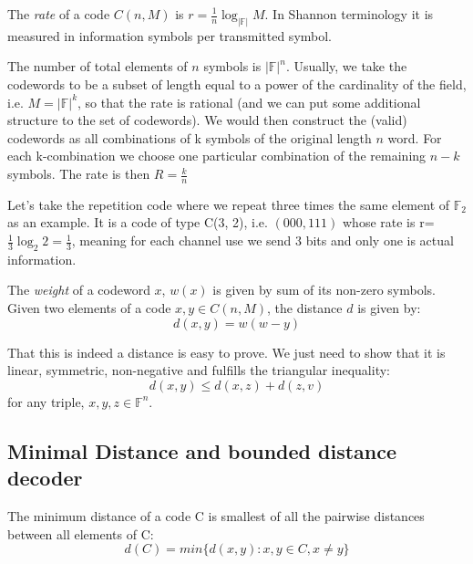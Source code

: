 \begin{definition}
	The \emph{rate} of a code $C(n,M)$ is $r=\frac{1}{n}\log_{|\mathbb{F}|}M$. In Shannon terminology it is measured in information symbols per transmitted symbol.
\end{definition}
The number of total elements of $n$ symbols is $|\mathbb{F}|^{n}$. Usually, we take the codewords to be a subset of length equal to a power of the cardinality of the field, i.e. $M = |\mathbb{F}|^{k}$, so that the rate is rational (and we can put some additional structure to the set of codewords). We would then construct the (valid) codewords as all combinations of k symbols of the original length $n$ word. For each k-combination we choose one particular combination of the remaining $n-k$ symbols. The rate is then $R=\frac{k}{n}$

\begin{example}
	Let's take the repetition code where we repeat three times the same element of $\mathbb{F}_2$ as an example. It is a code of type C(3, 2), i.e. $(000, 111)$ whose rate is r=$\frac{1}{3}\log_2 2=\frac{1}{3}$, meaning for each channel use we send 3 bits and only one is actual information.
\end{example}

\begin{definition}
	The \emph{weight} of a codeword $x$, $w(x)$ is given by sum of its non-zero symbols. \newline
	Given two elements of a code $x, y \in C(n, M)$, the distance $d$ is given by:
	\begin{equation}
	d(x, y) = w(w-y)
	\end{equation}   
\end{definition}

That this is indeed a distance is easy to prove. We just need to show that it is linear, symmetric, non-negative and fulfills the triangular inequality:
\begin{equation}
d(x, y) \le d(x,z) + d(z, v)
\end{equation}
for any triple, $x, y, z \in \mathbb{F}^n$.

\subsection{Minimal Distance and bounded distance decoder}

\begin{definition}
	The minimum distance of a code C is smallest of all the pairwise distances between all elements of C:
	\begin{equation}
	d(C) = min\{d(x, y): x, y \in C, x \neq y\}
	\end{equation}
\end{definition}



